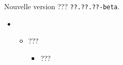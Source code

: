 Nouvelle version ??? \verb+??.??.??-beta+.

\begin{itemize}[itemsep=.5em]
    \item {}
    \begin{itemize}[itemsep=.5em]
        \item ???
        \begin{itemize}[itemsep=.5em, label=$\rightarrow$]
            \item ???
        \end{itemize}
    \end{itemize}




\end{itemize}

